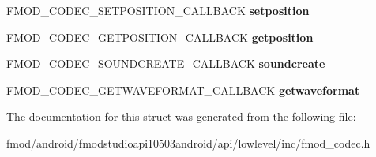 \begin{DoxyCompactItemize}
\item 
\hypertarget{struct_f_m_o_d___c_o_d_e_c___d_e_s_c_r_i_p_t_i_o_n_aa7fd03795bbeb2599cf28aabe6c23bd7}{F\+M\+O\+D\+\_\+\+C\+O\+D\+E\+C\+\_\+\+S\+E\+T\+P\+O\+S\+I\+T\+I\+O\+N\+\_\+\+C\+A\+L\+L\+B\+A\+C\+K {\bfseries setposition}}\label{struct_f_m_o_d___c_o_d_e_c___d_e_s_c_r_i_p_t_i_o_n_aa7fd03795bbeb2599cf28aabe6c23bd7}

\item 
\hypertarget{struct_f_m_o_d___c_o_d_e_c___d_e_s_c_r_i_p_t_i_o_n_aca4b4ae61caf677c7a6fbaed48e024ac}{F\+M\+O\+D\+\_\+\+C\+O\+D\+E\+C\+\_\+\+G\+E\+T\+P\+O\+S\+I\+T\+I\+O\+N\+\_\+\+C\+A\+L\+L\+B\+A\+C\+K {\bfseries getposition}}\label{struct_f_m_o_d___c_o_d_e_c___d_e_s_c_r_i_p_t_i_o_n_aca4b4ae61caf677c7a6fbaed48e024ac}

\item 
\hypertarget{struct_f_m_o_d___c_o_d_e_c___d_e_s_c_r_i_p_t_i_o_n_aec9ca5133371b75986e6fbcbf0b017fc}{F\+M\+O\+D\+\_\+\+C\+O\+D\+E\+C\+\_\+\+S\+O\+U\+N\+D\+C\+R\+E\+A\+T\+E\+\_\+\+C\+A\+L\+L\+B\+A\+C\+K {\bfseries soundcreate}}\label{struct_f_m_o_d___c_o_d_e_c___d_e_s_c_r_i_p_t_i_o_n_aec9ca5133371b75986e6fbcbf0b017fc}

\item 
\hypertarget{struct_f_m_o_d___c_o_d_e_c___d_e_s_c_r_i_p_t_i_o_n_ac0c601819e7806447a718b0d595e1189}{F\+M\+O\+D\+\_\+\+C\+O\+D\+E\+C\+\_\+\+G\+E\+T\+W\+A\+V\+E\+F\+O\+R\+M\+A\+T\+\_\+\+C\+A\+L\+L\+B\+A\+C\+K {\bfseries getwaveformat}}\label{struct_f_m_o_d___c_o_d_e_c___d_e_s_c_r_i_p_t_i_o_n_ac0c601819e7806447a718b0d595e1189}

\end{DoxyCompactItemize}


The documentation for this struct was generated from the following file\+:\begin{DoxyCompactItemize}
\item 
fmod/android/fmodstudioapi10503android/api/lowlevel/inc/fmod\+\_\+codec.\+h\end{DoxyCompactItemize}
